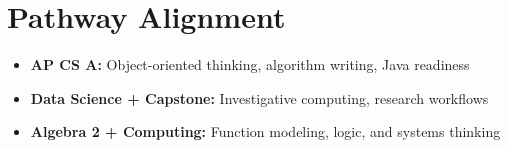 \documentclass[11pt]{article}
\begin{document}
\section*{Pathway Alignment}
\begin{itemize}[leftmargin=*]
  \item \textbf{AP CS A:} Object-oriented thinking, algorithm writing, Java readiness
  \item \textbf{Data Science + Capstone:} Investigative computing, research workflows
  \item \textbf{Algebra 2 + Computing:} Function modeling, logic, and systems thinking
\end{itemize}
\end{document}

